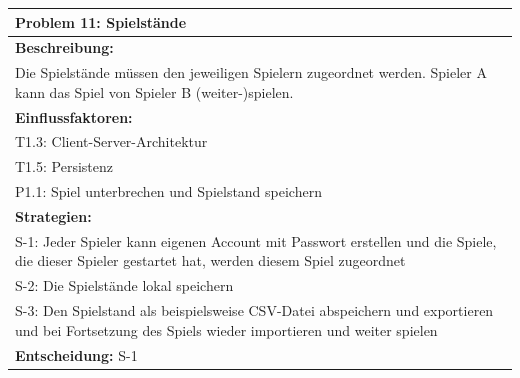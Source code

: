 \documentclass[fontsize=12pt,paper=a4,twoside]{scrartcl}
\begin{document}
\begin{longtable}{|p{15cm}|}
\hline
Problem 11: Spielstände                                                                     
\\ \hline                                                                                                                                                                                                                                                                                                                                                                                                                                                                                                                                                        
\textbf{Beschreibung:} \\
Die Spielstände müssen den jeweiligen Spielern zugeordnet werden. Spieler A kann das Spiel von Spieler B (weiter-)spielen.
\\ \hline
\textbf{Einflussfaktoren:} \\
T1.3: Client-Server-Architektur\\
T1.5: Persistenz \\
P1.1: Spiel unterbrechen und Spielstand speichern
\\ \hline
\textbf{Strategien:} \\
S-1: Jeder Spieler kann eigenen Account mit Passwort erstellen und die Spiele, die dieser Spieler gestartet hat, werden diesem Spiel zugeordnet \\
S-2: Die Spielstände lokal speichern \\
S-3: Den Spielstand als beispielsweise CSV-Datei abspeichern und exportieren und bei Fortsetzung des Spiels wieder importieren und weiter spielen
 \\ \hline
 \textbf{Entscheidung:} S-1
\\ \hline
\end{longtable}
\end{document}
